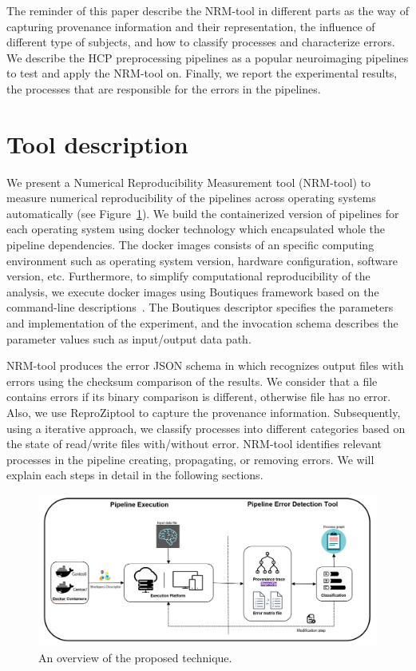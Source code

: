 \documentclass[a4paper,num-refs]{oup-contemporary}
\newcommand{\reprozip}[0]{ReproZip}
\begin{document}
The reminder of this paper describe the NRM-tool in different parts as 
the way of capturing provenance information and their representation, 
the influence of different type of subjects, and how to classify 
processes and characterize errors. We describe the HCP preprocessing 
pipelines as a popular neuroimaging pipelines to test and apply the 
NRM-tool on. Finally, we report the experimental results, the processes 
that are responsible for the errors in the pipelines.


\section{Tool description}

We present a Numerical Reproducibility Measurement tool (NRM-tool) to 
measure numerical reproducibility of the pipelines across operating 
systems automatically (see Figure~\ref{fig:overview}). We build the 
containerized version of pipelines for each operating system using 
docker technology which encapsulated whole the pipeline dependencies. 
The docker images consists of an specific computing environment such as 
operating system version, hardware configuration, software version, 
etc. Furthermore, to simplify computational reproducibility of the 
analysis, we execute docker images using Boutiques framework based on 
the command-line descriptions~\cite{glatard2017boutiques}. The 
Boutiques descriptor specifies the parameters and implementation of the 
experiment, and the invocation schema describes the parameter values 
such as input/output data path.

NRM-tool produces the error JSON schema in which recognizes output files 
with errors using the checksum comparison of the results. 
We consider that a file contains errors if 
its binary comparison is different, otherwise file has no error. Also, 
we use \reprozip tool to capture the provenance information. 
Subsequently, using a iterative approach, we classify processes into 
different categories based on the state of read/write files 
with/without error. NRM-tool identifies relevant processes in the 
pipeline creating, propagating, or removing errors. We will explain 
each steps in detail in the following sections.

\begin{figure}
\centering
  \includegraphics[width=\columnwidth]{images/overview.png}
  \caption{An overview of the proposed technique.}
  \label{fig:overview}
\end{figure}
\end{document}
